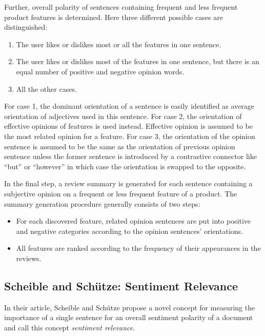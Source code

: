 \documentclass[a4paper,11pt]{article}
\begin{document}
Further, overall polarity of sentences containing frequent and less frequent
product features is determined.  Here three different possible cases are
distinguished:
\begin{enumerate}
  \item The user likes or dislikes most or all the features in one sentence.
  \item The user likes or dislikes most of the features in one sentence, but
    there is an equal number of positive and negative opinion words.
  \item All the other cases.
\end{enumerate}
For case 1, the dominant orientation of a sentence is easily identified as
average orientation of adjectives used in this sentence.  For case 2, the
orientation of effective opinions of features is used instead.  Effective
opinion is assumed to be the most related opinion for a feature.  For case 3,
the orientation of the opinion sentence is assumed to be the same as the
orientation of previous opinion sentence unless the former sentence is
introduced by a contrastive connector like ``but'' or ``however'' in which
case the orientation is swapped to the opposite.

In the final step, a review summary is generated for each sentence containing
a subjective opinion on a frequent or less frequent feature of a product.  The
summary generation procedure generally consists of two steps:
\begin{itemize}
  \item For each discovered feature, related opinion sentences are put into
    positive and negative categories according to the opinion sentences'
    orientations.

  \item All features are ranked according to the frequency of their
    appearances in the reviews.
\end{itemize}

\subsection{Scheible and Sch\"utze: Sentiment Relevance\cite{Scheible-13}}

In their article, Scheible and Sch\"utze propose a novel concept for
measuring the importance of a single sentence for an overall sentiment
polarity of a document and call this concept \textit{sentiment
  relevance}.
\end{document}
